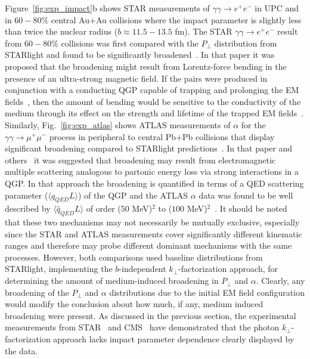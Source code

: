 \documentclass[twocolumn,epjc3]{svjour3}\sloppy
\begin{document}
Figure~\ref{fig:exp_impact}b shows STAR measurements of $\gamma\gamma \rightarrow e^+e^-$ in UPC and in $60-80\%$ central Au$+$Au collisions where the impact parameter is slightly less than twice the nuclear radius ($b\approx 11.5 - 13.5$ fm). 
The STAR $\gamma\gamma \rightarrow e^+e^-$ result from $60-80\%$ collisions was first compared with the $P_\perp$ distribution from STARlight and found to be significantly broadened~\cite{starcollaborationLowEnsuremathPair2018b}.
In that paper it was proposed that the broadening might result from Lorentz-force bending in the presence of an ultra-strong magnetic field. 
If the pairs were produced in conjunction with a conducting QGP capable of trapping and prolonging the EM fields~\cite{mclerranCommentsElectromagneticField2014}, then the amount of bending would be sensitive to the conductivity of the medium through its effect on the strength and lifetime of the trapped EM fields~\cite{kleinLeptonPairProduction2020a}. 
Similarly, Fig.~\ref{fig:exp_atlas} shows ATLAS measurements of $\alpha$ for the $\gamma\gamma \rightarrow \mu^+\mu^-$ process in peripheral to central Pb$+$Pb collisions that display significant broadening compared to STARlight predictions~\cite{atlascollaborationObservationCentralitydependentAcoplanarity2018}. 
In that paper and others~\cite{mclerranCommentsElectromagneticField2014} it was suggested that broadening may result from electromagnetic multiple scattering analogous to partonic energy loss via strong interactions in a QGP.
In that approach the broadening is quantified in terms of a QED scattering parameter ($\langle\hat{q}_{QED}L\rangle$) of the QGP and the ATLAS $\alpha$ data was found to be well described by $\langle\hat{q}_{QED}L\rangle$ of order ($50$ MeV)$^2$ to ($100$ MeV)$^2$~\cite{kleinLeptonPairProduction2020a,kleinAcoplanarityLeptonPair2019}.
It should be noted that these two mechanisms may not necessarily be mutually exclusive, especially since the STAR and ATLAS measurements cover significantly different kinematic ranges and therefore may probe different dominant mechanisms with the same processes. 
However, both comparisons used baseline distributions from {STARlight}, implementing the $b$-independent $k_\perp$-factorization approach, for determining the amount of medium-induced broadening in $P_\perp$ and $\alpha$.
Clearly, any broadening of the $P_\perp$ and $\alpha$ distributions due to the initial EM field configuration would modify the conclusion about how much, if any, medium induced broadening were present.
As discussed in the previous section, the experimental measurements from STAR~\cite{starcollaborationMeasurementMomentumAngular2021,starcollaborationLowEnsuremathPair2018b} and CMS~\cite{cmscollaborationObservationForwardNeutron2020a} have demonstrated that the photon $k_\perp$-factorization approach lacks impact parameter dependence clearly displayed by the data. 
\end{document}
